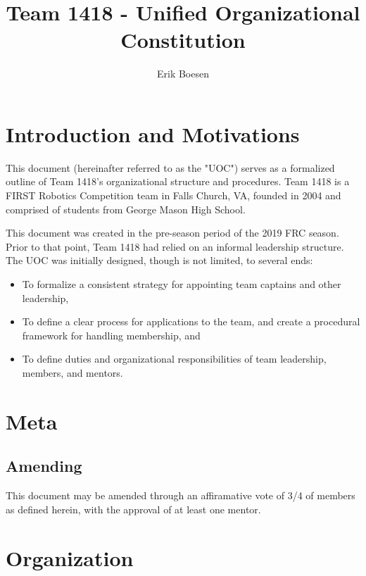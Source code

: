 \documentclass{proc}
\begin{document}
\title{Team 1418 - Unified Organizational Constitution}
\author{Erik Boesen}

\maketitle

\section{Introduction and Motivations}
This document (hereinafter referred to as the "UOC") serves as a formalized outline of Team 1418's organizational structure and procedures. Team 1418 is a FIRST Robotics Competition team in Falls Church, VA, founded in 2004 and comprised of students from George Mason High School.

This document was created in the pre-season period of the 2019 FRC season. Prior to that point, Team 1418 had relied on an informal leadership structure. The UOC was initially designed, though is not limited, to several ends:
\begin{itemize}
  \item{To formalize a consistent strategy for appointing team captains and other leadership,}
  \item{To define a clear process for applications to the team, and create a procedural framework for handling membership, and}
  \item{To define duties and organizational responsibilities of team leadership, members, and mentors.}
\end{itemize}

\section{Meta}
\subsection{Amending}
This document may be amended through an affiramative vote of 3/4 of members as defined herein, with the approval of at least one mentor.

\section{Organization}
\end{document}
